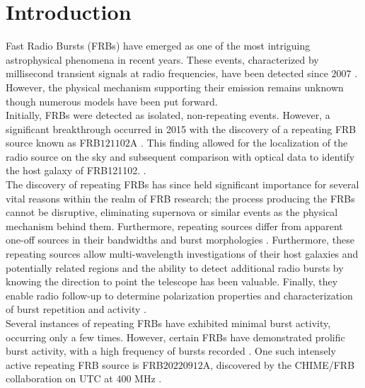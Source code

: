 \documentclass[twocolumn]{aastex631}
\begin{document}
\section{Introduction}
\label{sec:intro}
\indent Fast Radio Bursts (FRBs) have emerged as one of the most intriguing astrophysical phenomena in recent years. These events, characterized by millisecond transient signals at radio frequencies, have been detected since $2007$ \citep{lorimer2007bright}. However, the physical mechanism supporting their emission remains unknown though numerous models have been put forward.\\
\indent Initially, FRBs were detected as isolated, non-repeating events. However, a significant breakthrough occurred in 2015 with the discovery of a repeating FRB source known as FRB$121102$A \citep{spitler2016repeating, scholz2016repeating}. This finding allowed for the localization of the radio source on the sky and subsequent comparison with optical data to identify the host galaxy of FRB121102. \citep{chatterjee2017direct, tendulkar2017host, andersen2019chime}.\\
\indent The discovery of repeating FRBs has since held significant importance for several vital reasons within the realm of FRB research; the process producing the FRBs cannot be disruptive, eliminating supernova or similar events as the physical mechanism behind them. Furthermore, repeating sources differ from apparent one-off sources in their bandwidths and burst morphologies \citep{pleunis2021fast}. Furthermore, these repeating sources allow multi-wavelength investigations of their host galaxies and potentially related regions and the ability to detect additional radio bursts by knowing the 
direction to point the telescope has been valuable. Finally, they enable radio follow-up to determine polarization properties and characterization of burst repetition and activity \citep{andersen2019chime}.\\
\indent Several instances of repeating FRBs have exhibited minimal burst activity, occurring only a few times. However, certain FRBs have demonstrated prolific burst activity, with a high frequency of bursts recorded \citep{andersen2019chime}. One such intensely active repeating FRB source is FRB$20220912$A, discovered by the CHIME/FRB collaboration on   UTC at $400$ MHz \citep{mckinven2022nine}.\\ 
\end{document}
